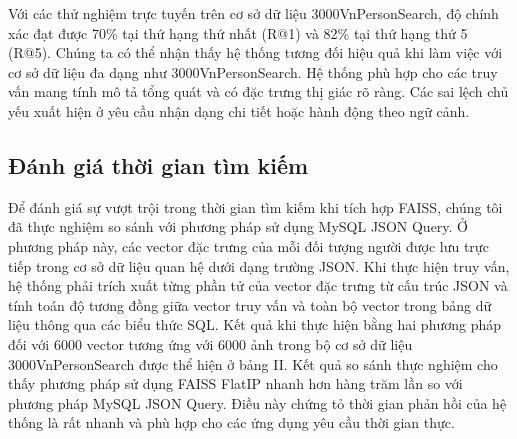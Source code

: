 \documentclass{jstarticle}
\begin{document}
Với các thử nghiệm trực tuyến trên cơ sở dữ liệu 3000VnPersonSearch, độ chính xác đạt được  70\%  tại  thứ hạng thứ nhất (R@1) và 82\% tại thứ hạng thứ  5 (R@5). Chúng ta có thể nhận thấy hệ thống tương đối hiệu quả khi làm việc với cơ sở dữ liệu đa dạng  như 3000VnPersonSearch. Hệ thống phù hợp cho các truy vấn mang tính mô tả tổng quát và có đặc trưng thị giác rõ ràng. Các sai lệch chủ yếu xuất hiện ở yêu cầu nhận dạng chi tiết hoặc hành động theo ngữ cảnh.
\subsection{Đánh giá thời gian tìm kiếm}
Để đánh giá sự vượt trội trong thời gian tìm kiếm khi tích hợp FAISS, chúng tôi đã thực nghiệm so sánh với phương pháp sử dụng MySQL JSON Query. Ở phương pháp này, các vector đặc trưng của mỗi đối tượng người được lưu trực tiếp trong cơ sở dữ liệu quan hệ dưới dạng trường JSON. Khi thực hiện truy vấn, hệ thống phải trích xuất từng phần tử của vector đặc trưng từ cấu trúc JSON và tính toán độ tương đồng giữa vector truy vấn và toàn bộ vector trong bảng dữ liệu thông qua các biểu thức SQL. Kết quả khi thực hiện bằng hai phương pháp đối với 6000 vector tương ứng với 6000 ảnh trong bộ cơ sở dữ liệu 3000VnPersonSearch được thể hiện ở bảng II. Kết quả so sánh thực nghiệm cho thấy phương pháp sử dụng FAISS FlatIP nhanh hơn hàng trăm lần so với phương pháp MySQL JSON Query. Điều này chứng tỏ thời gian phản hồi của hệ thống là rất nhanh và phù hợp cho các ứng dụng yêu cầu thời gian thực.

\begin{table}[htp!]
\centering
\caption{So sánh thời gian truy vấn.}
\renewcommand{\arraystretch}{1.2}
\label{tab:vector-search}
\end{table}
\end{document}
